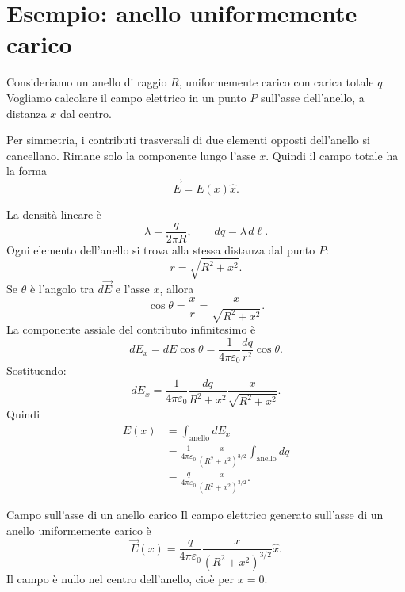 \documentclass[a4paper]{article}
\begin{document}
\section{Esempio: anello uniformemente carico}

Consideriamo un anello di raggio \(R\), uniformemente carico con carica totale \(q\). Vogliamo calcolare il campo elettrico in un punto \(P\) sull'asse dell'anello, a distanza \(x\) dal centro.

\begin{center}
\end{center}

Per simmetria, i contributi trasversali di due elementi opposti dell'anello si cancellano. Rimane solo la componente lungo l'asse \(x\). Quindi il campo totale ha la forma
\[
    \vec{E}=E(x)\hat{x}.
\]

La densità lineare è
\[
    \lambda=\frac{q}{2\pi R},
    \qquad
    dq=\lambda\,d\ell.
\]
Ogni elemento dell'anello si trova alla stessa distanza dal punto \(P\):
\[
    r=\sqrt{R^2+x^2}.
\]
Se \(\theta\) è l'angolo tra \(d\vec{E}\) e l'asse \(x\), allora
\[
    \cos\theta=\frac{x}{r}=\frac{x}{\sqrt{R^2+x^2}}.
\]
La componente assiale del contributo infinitesimo è
\[
    dE_x=dE\cos\theta
    =\frac{1}{4\pi\varepsilon_0}\frac{dq}{r^2}\cos\theta.
\]
Sostituendo:
\[
    dE_x=\frac{1}{4\pi\varepsilon_0}\frac{dq}{R^2+x^2}\frac{x}{\sqrt{R^2+x^2}}.
\]
Quindi
\begin{align*}
    E(x)
    &=\int_{\text{anello}}dE_x \\
    &=\frac{1}{4\pi\varepsilon_0}\frac{x}{(R^2+x^2)^{3/2}}\int_{\text{anello}}dq \\
    &=\frac{q}{4\pi\varepsilon_0}\frac{x}{(R^2+x^2)^{3/2}}.
\end{align*}

\begin{snippettheorem}{Campo sull'asse di un anello carico}
    Il campo elettrico generato sull'asse di un anello uniformemente carico è
    \[
        \vec{E}(x)=\frac{q}{4\pi\varepsilon_0}\frac{x}{(R^2+x^2)^{3/2}}\hat{x}.
    \]
    Il campo è nullo nel centro dell'anello, cioè per \(x=0\).
\end{snippettheorem}
\end{document}

